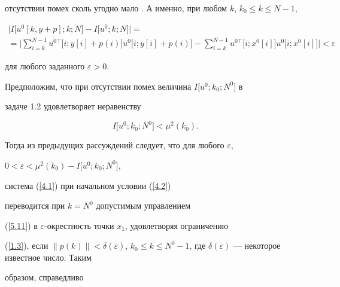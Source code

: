 отсутствии помех сколь угодно мало \cite{5}. А именно, при любом $k$, $k_0\le


k\le N-1$,


\begin{multline*}


\bigl|I\bigl[u^0[k, y+p]; k; N\bigr]-I\bigl[u^0; k; N\bigr]\bigr|=\\


%


=\biggl|\sum_{i=k}^{N-1}u^{0 \top}\bigl[i; y[i]+


p(i)\bigr] u^0\bigl[i; y[i]+p(i)


\bigr]-\sum_{i=k}^{N-1}u^{0 \top}\bigl[i; x^0[i]\bigr] u^0\bigl[i; x^0[i]


\bigr]\biggr|<\varepsilon


\end{multline*}


для любого заданного $\varepsilon >0$.





Предположим, что при отсутствии помех величина $I\bigl[u^0; k_0; N^0\bigr]$ в


задаче 1.2 удовлетворяет неравенству


\begin{equation}\label{4.3}


I\bigl[u^0; k_0; N^0\bigr]<\mu^2(k_0).


\end{equation}


Тогда из предыдущих рассуждений следует, что для любого $\varepsilon$,


$0<\varepsilon<\mu^2(k_0)-I\bigl[u^0; k_0; N^0\bigr]$,


система (\ref{4.1}) при начальном условии (\ref{4.2})


переводится при $k=N^0$ допустимым управлением


(\ref{5.11}) в $\varepsilon$-окрестность точки $x_1$, удовлетворяя ограничению


(\ref{1.3}), если $\bigl\|p(k)\bigr\|<\delta(\varepsilon)$, $k_0\le


k\le N^0-1$, где $\delta(\varepsilon)$ --- некоторое известное число. Таким


образом, справедливо






